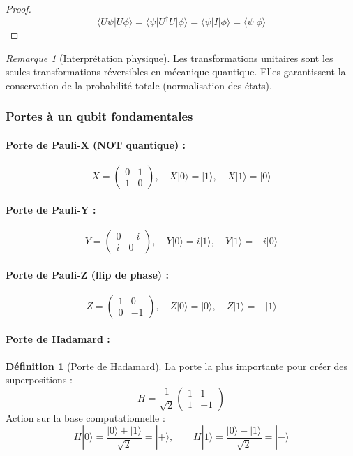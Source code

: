 \documentclass[12pt,a4paper]{article}
\theoremstyle{definition}
\newtheorem{definition}[theorem]{Définition}
\theoremstyle{remark}
\newtheorem{remark}[theorem]{Remarque}
\begin{document}
\begin{proof}
\[
\langle U\psi | U\phi \rangle = \langle \psi | U^\dagger U | \phi \rangle = \langle \psi | I | \phi \rangle = \langle \psi | \phi \rangle
\]
\end{proof}

\begin{remark}[Interprétation physique]
Les transformations unitaires sont les seules transformations réversibles en mécanique quantique. Elles garantissent la conservation de la probabilité totale (normalisation des états).
\end{remark}

\subsubsection{Portes à un qubit fondamentales}

\paragraph{Porte de Pauli-X (NOT quantique) :}
\[
X = \begin{pmatrix} 0 & 1 \\ 1 & 0 \end{pmatrix}, \quad X|0\rangle = |1\rangle, \quad X|1\rangle = |0\rangle
\]

\paragraph{Porte de Pauli-Y :}
\[
Y = \begin{pmatrix} 0 & -i \\ i & 0 \end{pmatrix}, \quad Y|0\rangle = i|1\rangle, \quad Y|1\rangle = -i|0\rangle
\]

\paragraph{Porte de Pauli-Z (flip de phase) :}
\[
Z = \begin{pmatrix} 1 & 0 \\ 0 & -1 \end{pmatrix}, \quad Z|0\rangle = |0\rangle, \quad Z|1\rangle = -|1\rangle
\]

\paragraph{Porte de Hadamard :}
\begin{definition}[Porte de Hadamard]
La porte la plus importante pour créer des superpositions :
\[
H = \frac{1}{\sqrt{2}} \begin{pmatrix} 1 & 1 \\ 1 & -1 \end{pmatrix}
\]
Action sur la base computationnelle :
\[
H|0\rangle = \frac{|0\rangle + |1\rangle}{\sqrt{2}} = |+\rangle, \qquad H|1\rangle = \frac{|0\rangle - |1\rangle}{\sqrt{2}} = |-\rangle
\]
\end{definition}
\end{document}
